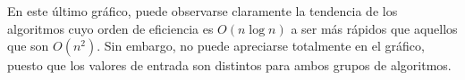 \documentclass[11pt]{article}
\begin{document}
En este último gráfico, puede observarse claramente la tendencia de los algoritmos cuyo orden de eficiencia es $O(n\log n)$ a ser más rápidos que aquellos que son $O(n^2)$. Sin embargo, no puede apreciarse totalmente en el gráfico, puesto que los valores de entrada son distintos para ambos grupos de algoritmos.

\newpage





%	
\end{document}
